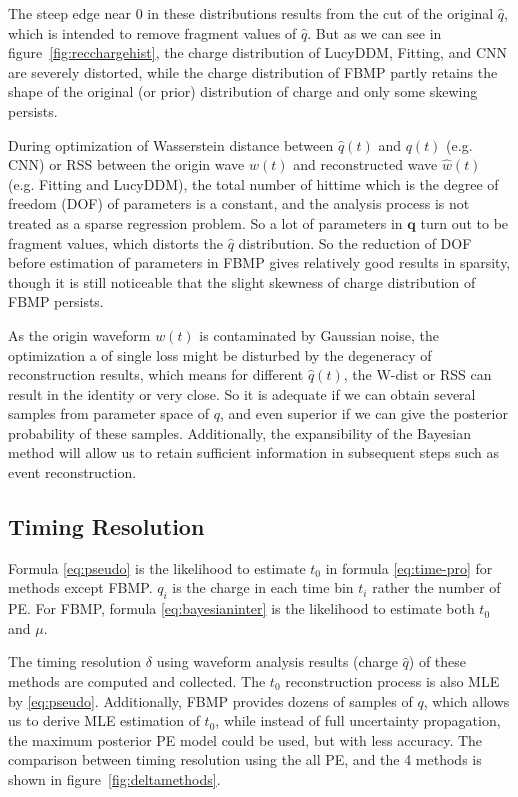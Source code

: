 The steep edge near 0 in these distributions results from the cut of the original $\hat{q}$, which is intended to remove fragment values of $\hat{q}$. But as we can see in figure~\ref{fig:recchargehist}, the charge distribution of LucyDDM, Fitting, and CNN are severely distorted, while the charge distribution of FBMP partly retains the shape of the original (or prior) distribution of charge and only some skewing persists. 

During optimization of Wasserstein distance between $\hat{q}(t)$ and $q(t)$ (e.g. CNN) or RSS between the origin wave $w(t)$ and reconstructed wave $\hat{w}(t)$ (e.g. Fitting and LucyDDM), the total number of hittime which is the degree of freedom (DOF) of parameters is a constant, and the analysis process is not treated as a sparse regression problem. So a lot of parameters in $\bm{q}$ turn out to be fragment values, which distorts the $\hat{q}$ distribution. So the reduction of DOF before estimation of parameters in FBMP gives relatively good results in sparsity, though it is still noticeable that the slight skewness of charge distribution of FBMP persists. 


As the origin waveform $w(t)$ is contaminated by Gaussian noise, the optimization a of single loss might be disturbed by the degeneracy of reconstruction results, which means for different $\hat{q}(t)$, the W-dist or RSS can result in the identity or very close. So it is adequate if we can obtain several samples from parameter space of $q$, and even superior if we can give the posterior probability of these samples. Additionally, the expansibility of the Bayesian method will allow us to retain sufficient information in subsequent steps such as event reconstruction. 

\subsection{Timing Resolution}
\label{subsec:timeresolution}


Formula \eqref{eq:pseudo} is the likelihood to estimate $t_{0}$ in formula \eqref{eq:time-pro} for methods except FBMP. $q_{i}$ is the charge in each time bin $t_{i}$ rather the number of PE. For FBMP, formula \eqref{eq:bayesianinter} is the likelihood to estimate both $t_{0}$ and $\mu$. 

The timing resolution $\delta$ using waveform analysis results (charge $\hat{q}$) of these methods are computed and collected. The $t_{0}$ reconstruction process is also MLE by \eqref{eq:pseudo}. Additionally, FBMP provides dozens of samples of $q$, which allows us to derive MLE estimation of $t_{0}$, while instead of full uncertainty propagation, the maximum posterior PE model could be used, but with less accuracy. The comparison between timing resolution using the all PE, and the 4 methods is shown in figure~\ref{fig:deltamethods}. 

